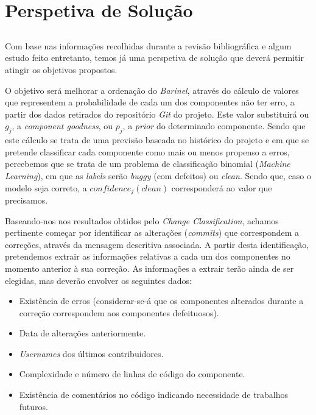 \chapter{Perspetiva de Solução}\label{chap:chap3}

\section*{}

Com base nas informações recolhidas durante a revisão bibliográfica e algum estudo feito entretanto, temos já uma perspetiva de solução que deverá permitir atingir os objetivos propostos.

O objetivo será melhorar a ordenação do \emph{Barinel}, através do cálculo de valores que representem a probabilidade de cada um dos componentes não ter erro, a partir dos dados retirados do repositório \emph{Git} do projeto. Este valor substituirá ou $g_j$, a \emph{component goodness}, ou $p_j$, a \emph{prior} do determinado componente.
%
Sendo que este cálculo se trata de uma previsão baseada no histórico do projeto e em que se pretende classificar cada componente como mais ou menos propenso a erros, percebemos que se trata de um problema de classificação binomial (\emph{Machine Learning}), em que as \emph{labels} serão \emph{buggy} (com defeitos) ou \emph{clean}. Sendo que, caso o modelo seja correto, a $confidence_j(clean)$ corresponderá ao valor que precisamos. 

Baseando-nos nos resultados obtidos pelo \emph{Change Classification}, achamos pertinente começar por identificar as alterações (\emph{commits}) que correspondem a correções, através da mensagem descritiva associada.
A partir desta identificação, pretendemos extrair as informações relativas a cada um dos componentes no momento anterior à sua correção. As informações a extrair terão ainda de ser elegidas, mas deverão envolver os seguintes dados:
%
\begin{itemize}
	\item Existência de erros (considerar-se-á que os componentes alterados durante a correção correspondem aos componentes defeituosos).
	\item Data de alterações anteriormente.
	\item \emph{Usernames} dos últimos contribuidores.
	\item Complexidade e número de linhas de código do componente.
	\item Existência de comentários no código indicando necessidade de trabalhos futuros.
\end{itemize}

